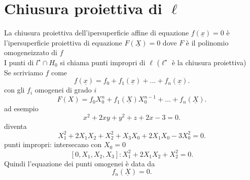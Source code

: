 \documentclass[12px]{article}
\begin{document}
	\section {Chiusura proiettiva di $\ell$ }
	La chiusura proiettiva dell'ipersuperficie affine di equazione $f(\underline x) =0$ è l'ipersuperficie proiettiva di equazione  $F(\underline X)=0$ dove  $F$ è il polinomio omogeneizzato  di $f$\\
	I punti di  $l^\star \cap H_0$ si chiama punti impropri di $\ell$ ($\ell^\star$ è la chiusura proiettiva)\\
	Se scriviamo $f$ come\\
	\[
	 f(\underline x) = f_0 + f_1(\underline x) + \ldots + f_n(\underline x)
	.\] 
	con gli $f_i$ omogenei di grado $i$
	 \[
		 F(X) = f_0 X_0^n + f_1(\underline X)X_0^{n-1}+\ldots+f_n(\underline X)
	.\] 
	ad esempio
	\[
	x^2 + 2xy + y^2 + z+ 2x-3 = 0
	.\] 
	diventa
	\[
	X_1^2 + 2X_1X_2 + X_2^2 +X_3X_0 + 2X_1X_0-3X_0^2=0
	.\] 
	punti impropri: intersecano con $X_0 =0 $\\
	\[
		[0,X_1,X_2,X_3]:X_1^2 + 2X_1X_2 + X_2^2 =0 
	.\] 
	Quindi l'equazione dei punti omogenei è data da 
	\[
	 f_n(\underline X) = 0
	.\] 
\end{document}
